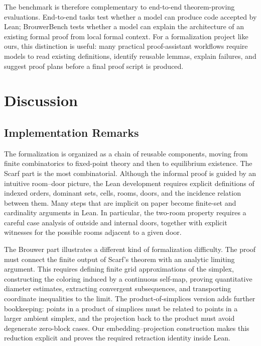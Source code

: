 \documentclass{article}
\theoremstyle{definition}
\begin{document}
The benchmark is therefore complementary to end-to-end theorem-proving evaluations. End-to-end tasks test whether a model can produce code accepted by Lean; BrouwerBench tests whether a model can explain the architecture of an existing formal proof from local formal context. For a formalization project like ours, this distinction is useful: many practical proof-assistant workflows require models to read existing definitions, identify reusable lemmas, explain failures, and suggest proof plans before a final proof script is produced.


\section{Discussion}
\label{sec:discuss}

\subsection{Implementation Remarks}

The formalization is organized as a chain of reusable components, moving from finite combinatorics to fixed-point theory and then to equilibrium existence. 
The Scarf part is the most combinatorial. Although the informal proof is guided by an intuitive room--door picture, the Lean development requires explicit definitions of indexed orders, dominant sets, cells, rooms, doors, and the incidence relation between them. Many steps that are implicit on paper become finite-set and cardinality arguments in Lean. In particular, the two-room property requires a careful case analysis of outside and internal doors, together with explicit witnesses for the possible rooms adjacent to a given door.

The Brouwer part illustrates a different kind of formalization difficulty. The proof must connect the finite output of Scarf's theorem with an analytic limiting argument. This requires defining finite grid approximations of the simplex, constructing the coloring induced by a continuous self-map, proving quantitative diameter estimates, extracting convergent subsequences, and transporting coordinate inequalities to the limit. The product-of-simplices version adds further bookkeeping: points in a product of simplices must be related to points in a larger ambient simplex, and the projection back to the product must avoid degenerate zero-block cases. Our embedding--projection construction makes this reduction explicit and proves the required retraction identity inside Lean.
\end{document}
